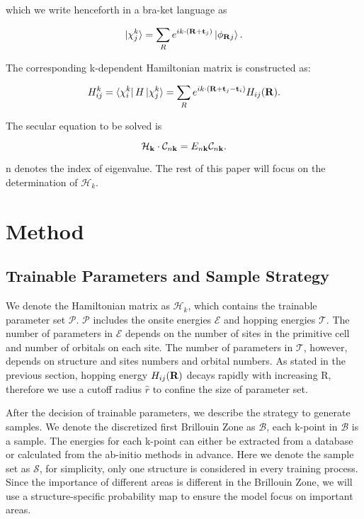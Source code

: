 \documentclass{article} %
\begin{document}
which we write henceforth in a bra-ket language as

\begin{equation}
\ket{\chi^k_j} = \sum_R  e^{ik\cdot(\bold{R}+\bold{t}_j)} \ket{\phi_{\bold{R}j}}.
\end{equation}

The corresponding k-dependent Hamiltonian matrix is constructed as:

\begin{equation}
H^k_{ij} = \bra{\chi^k_i}H\ket{\chi^k_j} = \sum_R  e^{ik\cdot(\bold{R}+
\bold{t}_j-\bold{t}_i)} H_{ij}(\bold{R}).
\end{equation}

The secular equation to be solved is

\begin{equation}
\mathcal{H}_\bold{k}\cdot\mathcal{C}_{n\bold{k}}
=E_{n\bold{k}}\mathcal{C}_{n\bold{k}}.
\end{equation}

n denotes the index of eigenvalue. The rest of this paper will focus on the determination of $\mathcal{H}_k$.

\section{Method}

\subsection{Trainable Parameters and Sample Strategy}

We denote the Hamiltonian matrix as $\mathcal{H}_k$, which contains the trainable parameter
set $\mathcal{P}$. $\mathcal{P}$ includes the onsite energies $\mathcal{E}$ and hopping energies
$\mathcal{T}$. The number of parameters in $\mathcal{E}$ depends on the number of sites in the
primitive cell and number of orbitals on each site. The number of parameters in $\mathcal{T}$, 
however, depends on structure and sites numbers and orbital numbers. As stated in the previous section,
hopping energy $H_{ij}(\bold{R})$ decays rapidly with increasing R, therefore we use a cutoff radius
$\hat{r}$ to confine the size of parameter set.

After the decision of trainable parameters, we describe the strategy to generate samples. We denote
the discretized first Brillouin Zone as $\mathcal{B}$, each k-point in $\mathcal{B}$ is a sample.
The energies for each k-point can either be extracted from a database or calculated from the ab-initio
methods in advance. Here we denote the sample set as $\mathcal{S}$, for simplicity, only one structure
is considered in every training process. Since the importance of different areas is different in the Brillouin
Zone, we will use a structure-specific probability map to ensure the model focus on important areas.
\end{document}
